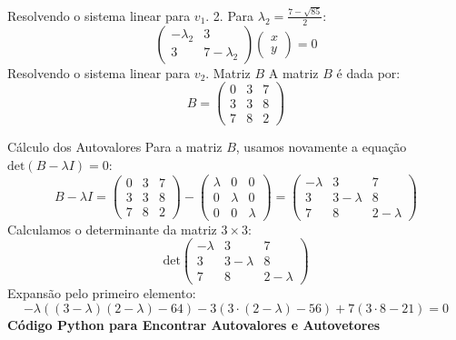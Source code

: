 Resolvendo o sistema linear para \(v_1\).
2. Para \(\lambda_2 = \frac{7 - \sqrt{85}}{2}\):
\[
\left(\begin{array}{cc} -\lambda_2 & 3 \\ 3 & 7-\lambda_2 \end{array}\right) \left(\begin{array}{c} x \\ y \end{array}\right) = 0
\]
Resolvendo o sistema linear para \(v_2\).
Matriz \(B\)
A matriz \(B\) é dada por:
\[ B = \left(\begin{array}{ccc} 0 & 3 & 7 \\ 3 & 3 & 8 \\ 7 & 8 & 2 \end{array}\right) \]

Cálculo dos Autovalores
Para a matriz \(B\), usamos novamente a equação \(\text{det}(B - \lambda I) = 0\):
\[
B - \lambda I = \left(\begin{array}{ccc} 0 & 3 & 7 \\ 3 & 3 & 8 \\ 7 & 8 & 2 \end{array}\right) - \left(\begin{array}{ccc} \lambda & 0 & 0 \\ 0 & \lambda & 0 \\ 0 & 0 & \lambda \end{array}\right) = \left(\begin{array}{ccc} -\lambda & 3 & 7 \\ 3 & 3-\lambda & 8 \\ 7 & 8 & 2-\lambda \end{array}\right)
\]
Calculamos o determinante da matriz \(3 \times 3\):
\[
\text{det}\left(\begin{array}{ccc} -\lambda & 3 & 7 \\ 3 & 3-\lambda & 8 \\ 7 & 8 & 2-\lambda \end{array}\right)
\]
Expansão pelo primeiro elemento:
\[
-\lambda \left( \left(3 - \lambda\right)\left(2 - \lambda\right) - 64 \right) - 3 \left( 3 \cdot (2-\lambda) - 56 \right) + 7 \left( 3 \cdot 8 - 21 \right) = 0
\]
\textbf{Código Python para Encontrar Autovalores e Autovetores}
